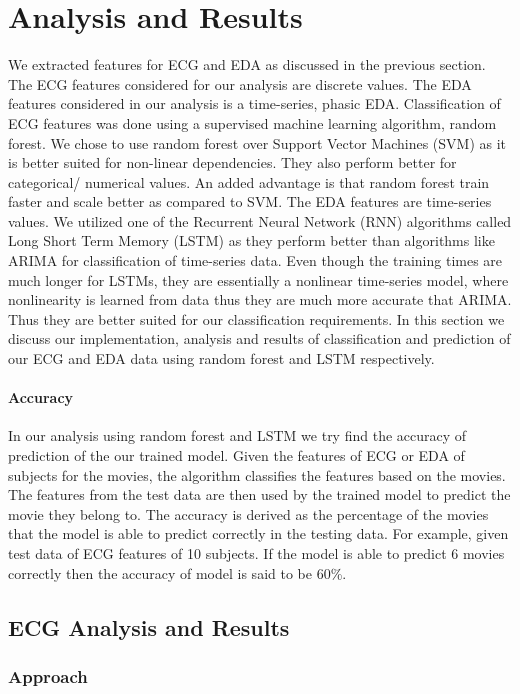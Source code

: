 \section{Analysis and Results}
We extracted features for ECG and EDA as discussed in the previous section. The ECG features considered for our analysis are discrete values. The EDA features considered in our analysis is a time-series, phasic EDA. Classification of ECG features was done using a supervised machine learning algorithm, random forest. We chose to use random forest over Support Vector Machines (SVM) as it is better suited for non-linear dependencies. They also perform better for categorical/ numerical values. An added advantage is that random forest train faster and scale better as compared to SVM. The EDA features are time-series values. We utilized one of the Recurrent Neural Network (RNN) algorithms called Long Short Term Memory (LSTM) as they perform better than algorithms like ARIMA for classification of time-series data. Even though the training times are much longer for LSTMs, they are essentially a nonlinear time-series model, where nonlinearity is learned from data thus they are much more accurate that ARIMA. Thus they are better suited for our classification requirements. In this section we discuss our implementation, analysis and results of classification and prediction of our ECG and EDA data using random forest and LSTM respectively.

 \paragraph{Accuracy} In our analysis using random forest and LSTM we try find the accuracy of prediction of the our trained model. Given the features of ECG or EDA of subjects for the movies, the algorithm classifies the features based on the movies. The features from the test data are then used by the trained model to predict the movie they belong to. The accuracy is derived as the percentage of the movies that the model is able to predict correctly in the testing data. For example, given test data of ECG features of 10 subjects. If the model is able to predict 6 movies correctly then the accuracy of model is said to be 60\%. 

\subsection{ECG Analysis and Results}
\subsubsection{Approach}
